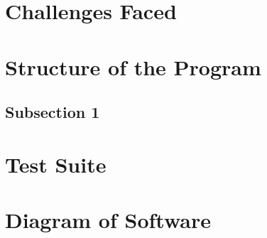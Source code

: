 \documentclass[12pt,letterpaper, onecolumn]{exam}
\begin{document}
\section{Challenges Faced}


\section{Structure of the Program}
\subsection{Subsection 1}



\section{Test Suite}

\section{Diagram of Software}
\end{document}
